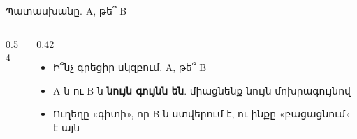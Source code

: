 \begin{frame}{Պատասխանը. A, թե՞ B}
  \begin{columns}[c]
    \begin{column}{0.54\textwidth}
      \centering
      
    \end{column}
    \begin{column}{0.42\textwidth}
      \begin{itemize}
        \item Ի՞նչ գրեցիր սկզբում. A, թե՞ B
        \item<2-> A-ն ու B-ն \textbf{նույն գույնն են}. միացնենք նույն մոխրագույնով
        \item<3-> Ուղեղը «գիտի», որ B-ն ստվերում է, ու ինքը «բացացնում» է այն
      \end{itemize}
    \end{column}
  \end{columns}
\end{frame}

